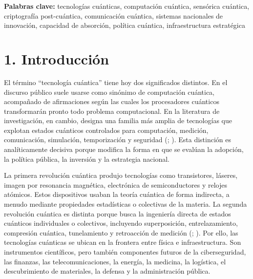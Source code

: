 \documentclass[
  11pt,
  letterpaper,
]{article}
\begin{document}
\textbf{Palabras clave:} tecnologías cuánticas, computación cuántica,
sensórica cuántica, criptografía post-cuántica, comunicación cuántica,
sistemas nacionales de innovación, capacidad de absorción, política
cuántica, infraestructura estratégica

\section{1. Introducción}\label{introducciuxf3n}

El término ``tecnología cuántica'' tiene hoy dos significados distintos.
En el discurso público suele usarse como sinónimo de computación
cuántica, acompañado de afirmaciones según las cuales los procesadores
cuánticos transformarán pronto todo problema computacional. En la
literatura de investigación, en cambio, designa una familia más amplia
de tecnologías que explotan estados cuánticos controlados para
computación, medición, comunicación, simulación, temporización y
seguridad (;
). Esta distinción es
analíticamente decisiva porque modifica la forma en que se evalúan la
adopción, la política pública, la inversión y la estrategia nacional.

La primera revolución cuántica produjo tecnologías como transistores,
láseres, imagen por resonancia magnética, electrónica de semiconductores
y relojes atómicos. Estos dispositivos usaban la teoría cuántica de
forma indirecta, a menudo mediante propiedades estadísticas o colectivas
de la materia. La segunda revolución cuántica es distinta porque busca
la ingeniería directa de estados cuánticos individuales o colectivos,
incluyendo superposición, entrelazamiento, compresión cuántica,
tunelamiento y retroacción de medición
(;
). Por
ello, las tecnologías cuánticas se ubican en la frontera entre física e
infraestructura. Son instrumentos científicos, pero también componentes
futuros de la ciberseguridad, las finanzas, las telecomunicaciones, la
energía, la medicina, la logística, el descubrimiento de materiales, la
defensa y la administración pública.
\end{document}
